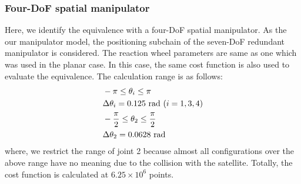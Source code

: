 \documentclass[preprint,12pt]{elsarticle}
\def\unit#1{{~\mathrm{#1}}}
\begin{document}
\subsubsection{Four-DoF spatial manipulator}
Here, we identify the equivalence with a four-DoF spatial manipulator.
As the our manipulator model, the positioning subchain of the seven-DoF redundant manipulator is considered.
The reaction wheel parameters are same as one which was used in the planar case.
In this case, the same cost function is also used to evaluate the equivalence.
The calculation range is as follows:
%
\begin{align}
  &-\pi \leq \theta_{i} \leq \pi\notag\\
  &\Delta \theta_{i} = 0.125\unit{rad}~(i = 1,3,4)\\
  &-\frac{\pi}{2} \leq \theta_{2} \leq \frac{\pi}{2}\notag\\
  &\Delta \theta_{2} = 0.0628\unit{rad}
\end{align}
%
where, we restrict the range of joint 2 because almost all configurations over the above range
have no meaning due to the collision with the satellite.
Totally, the cost function is calculated at $6.25\times 10^{6}$ points.
\end{document}
